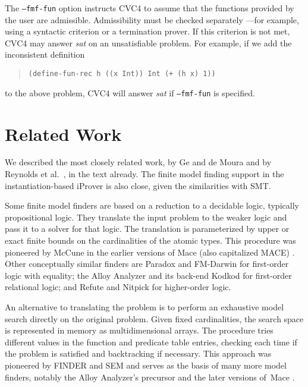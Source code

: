 \documentclass[runningheads,a4paper]{llncs}
\newcommand\cvc{CVC4\xspace}
\begin{document}
The \texttt{--fmf-fun} option instructs \cvc to assume that the
functions provided by the user are admissible.
Admissibility must be checked separately ---for example, using a
syntactic criterion or a termination prover.
If this criterion is not met, \cvc may answer \emph{sat} on
an unsatisfiable problem. For example, if we add the inconsistent definition
%
\begin{quote}
\begin{verbatim}
(define-fun-rec h ((x Int)) Int (+ (h x) 1))
\end{verbatim}
\end{quote}
%
to the above problem, \cvc will answer \emph{sat}
if \texttt{--fmf-fun} is specified.


\section{Related Work}

We described the most closely related work, by Ge and de Moura
\cite{GeDeM-CAV-09} and by Reynolds et al.\
\cite{ReyEtAl-1-RR-13,reynolds-et-al-2013}, in the text already.
The finite model finding support in the instantiation-based iProver
\cite{korovin-2013} is also close, given the similarities with SMT.


Some finite model finders are based on a reduction to a decidable logic,
typically propositional logic. They translate the input problem to the weaker
logic and pass it to a solver for that logic.
The translation is parameterized by upper or exact finite bounds on
the cardinalities of the atomic types. This procedure was pioneered by McCune
in the earlier versions of Mace (also capitalized MACE) \cite{mccune-1994}.
Other conceptually similar finders are Paradox \cite{claessen-sorensson-2003}
and FM-Darwin \cite{baumgartner-et-al-2009} for first-order logic with
equality; the Alloy Analyzer and its back-end Kodkod \cite{torlak-jackson-2007}
for first-order relational logic; and Refute \cite{weber-2008} and Nitpick
\cite{blanchette-nipkow-2010} for higher-order logic.

An alternative to translating the problem is to perform
an exhaustive model search directly on the original problem. Given fixed
cardinalities, the search space is represented in memory as multidimensional
arrays. The procedure tries different values in the function and predicate
table entries, checking each time if the problem is satisfied and backtracking
if necessary. This approach was pioneered by FINDER \cite{slaney-1994} and
SEM \cite{zhang-zhang-1995} and serves as the basis of many more model finders,
notably the Alloy Analyzer's precursor \cite{jackson-1996} and the later
versions of~Mace \cite{mccune-prover9-mace4}.
\end{document}
